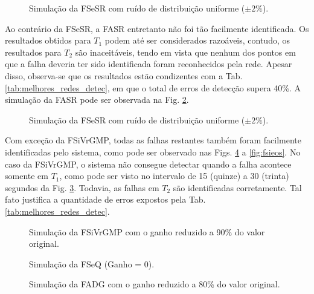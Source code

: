 \begin{figure}[htb]
\footnotesize
\centering

\vspace{1cm}
\caption{Simulação da FSeSR com ruído de distribuição uniforme ($\pm 2\%$).}
\label{fig:fsesr}
\end{figure}

Ao contrário da FSeSR, a FASR entretanto não foi tão facilmente identificada. Os
resultados obtidos para $T_1$ podem até ser considerados razoáveis, contudo, os
resultados para $T_2$ são inaceitáveis, tendo em vista que nenhum dos pontos em
que a falha deveria ter sido identificada foram reconhecidos pela rede. Apesar
disso, observa-se que os resultados estão condizentes com a Tab.
\ref{tab:melhores_redes_detec}, em que o total de erros de detecção supera 40\%.
A simulação da FASR pode ser observada na Fig. \ref{fig:fasr}.

\begin{figure}[htb] \footnotesize \centering 
\vspace{1cm} \caption{Simulação da FSeSR com ruído de distribuição uniforme
($\pm 2\%$).} \label{fig:fasr} \end{figure}

Com exceção da FSiVrGMP, todas as falhas restantes também foram facilmente
identificadas pelo sistema, como pode ser observado nas Figs. \ref{fig:fseq} a
\ref{fig:fsieos}. No caso da FSiVrGMP, o sistema não consegue detectar quando a
falha acontece somente em $T_1$, como pode ser visto no intervalo de 15 (quinze)
a 30 (trinta) segundos da Fig. \ref{fig:fsivrgmp}. Todavia, as falhas em $T_2$
são identificadas corretamente. Tal fato justifica a quantidade de erros
expostos pela Tab. \ref{tab:melhores_redes_detec}.

\begin{figure}[htb]
\footnotesize
\centering

\vspace{1cm}
\caption{Simulação da FSiVrGMP com o ganho reduzido a 90\% do valor original.}
\label{fig:fsivrgmp}
\end{figure}

\begin{figure}[htb]
\footnotesize
\centering

\vspace{1cm}
\caption{Simulação da FSeQ (Ganho = 0).}
\label{fig:fseq}
\end{figure}

\begin{figure}[htb]
\footnotesize
\centering

\vspace{1cm}
\caption{Simulação da FADG com o ganho reduzido a 80\% do valor original.}
\label{fig:fadg}
\end{figure}

